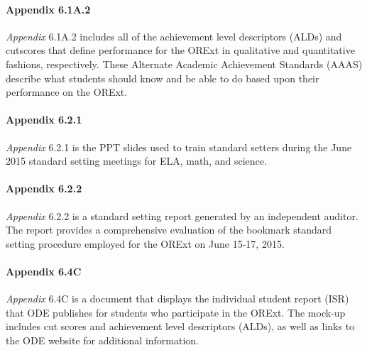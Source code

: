 \documentclass[]{article}
\let\oldparagraph\paragraph
\renewcommand{\paragraph}[1]{\oldparagraph{#1}\mbox{}}
\begin{document}
\paragraph{Appendix 6.1A.2}\label{appendix-6.1a.2}

\emph{Appendix} 6.1A.2 includes all of the achievement level descriptors
(ALDs) and cutscores that define performance for the ORExt in
qualitative and quantitative fashions, respectively. These Alternate
Academic Achievement Standards (AAAS) describe what students should know
and be able to do based upon their performance on the ORExt.

\paragraph{Appendix 6.2.1}\label{appendix-6.2.1}

\emph{Appendix} 6.2.1 is the PPT slides used to train standard setters
during the June 2015 standard setting meetings for ELA, math, and
science.

\paragraph{Appendix 6.2.2}\label{appendix-6.2.2}

\emph{Appendix} 6.2.2 is a standard setting report generated by an
independent auditor. The report provides a comprehensive evaluation of
the bookmark standard setting procedure employed for the ORExt on June
15-17, 2015.

\paragraph{Appendix 6.4C}\label{appendix-6.4c}

\emph{Appendix} 6.4C is a document that displays the individual student
report (ISR) that ODE publishes for students who participate in the
ORExt. The mock-up includes cut scores and achievement level descriptors
(ALDs), as well as links to the ODE website for additional information.
\end{document}

